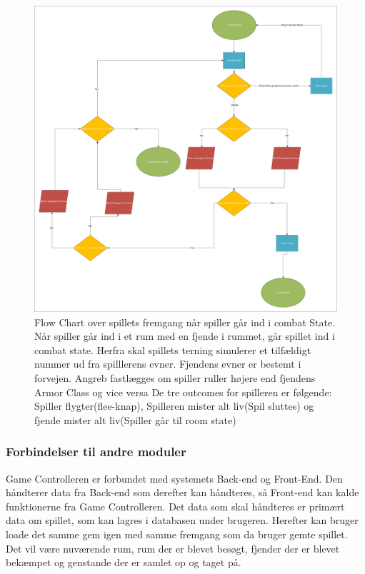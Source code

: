\begin{figure}[H]
\centering
\includegraphics[width = \textwidth]{02-Body/Images/Arkitektur - Combat State.pdf}
\caption{Flow Chart over spillets fremgang når spiller går ind i combat State. Når spiller går ind i et rum med en fjende i rummet, går spillet ind i combat state. Herfra skal spillets terning simulerer et tilfældigt nummer ud fra spilllerens evner. Fjendens evner er bestemt i forvejen. Angreb fastlægges om spiller ruller højere end fjendens Armor Class og vice versa De tre outcomes for spilleren er følgende: Spiller flygter(flee-knap), Spilleren mister alt liv(Spil sluttes) og fjende mister alt liv(Spiller går til room state)}
\label{fig:Arkitektur-SD-SaveGame}
\end{figure}
\subsubsection{Forbindelser til andre moduler}
Game Controlleren er forbundet med systemets Back-end og Front-End. Den håndterer data fra Back-end som derefter kan håndteres, så Front-end kan kalde funktionerne fra Game Controlleren. Det data som skal håndteres er primært data om spillet, som kan lagres i databasen under brugeren. Herefter kan bruger loade det samme gem igen med samme fremgang som da bruger gemte spillet. Det vil være nuværende rum, rum der er blevet besøgt, fjender der er blevet bekæmpet og genstande der er samlet op og taget på.